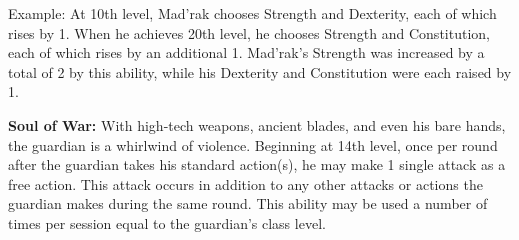 Example: At 10th level, Mad'rak chooses Strength and Dexterity, each of which rises by 1. When he achieves 20th level, he chooses Strength and Constitution, each of which rises by an additional 1. Mad'rak's Strength was increased by a total of 2 by this ability, while his Dexterity and Constitution were each raised by 1.

\textbf{Soul of War:} With high-tech weapons, ancient blades, and even his bare hands, the guardian is a whirlwind of violence. Beginning at 14th level, once per round after the guardian takes his standard action(s), he may make 1 single attack as a free action. This attack occurs in addition to any other attacks or actions the guardian makes during the same round. This ability may be used a number of times per session equal to the guardian's class level.



